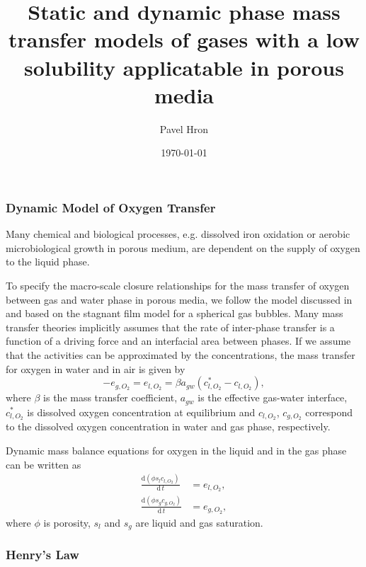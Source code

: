 \documentclass[a4paper,12pt]{article}
\title{Static and dynamic phase mass transfer models of gases with a
  low solubility applicatable in porous media}
\author{Pavel Hron}
\date{\today}
\newcommand{\Sl}{\mbox{$s_l\xspace$}}
\newcommand{\Sg}{\mbox{$s_g\xspace$}}
\newcommand{\dder}{\mbox{$\textrm{d}$}}
\newcommand{\agw}{\mbox{$a_{gw}\xspace$}}
\newcommand{\coxyw}{\mbox{$c_{l,O_2}\xspace$}}
\newcommand{\coxyg}{\mbox{$c_{g,O_2}\xspace$}}
\newcommand{\coxys}{\mbox{$c^*_{l,O_2}\xspace$}}
\begin{document}
\maketitle

\subsubsection*{Dynamic Model of Oxygen Transfer}
Many chemical and biological processes, e.g. dissolved iron oxidation
or aerobic microbiological growth in porous medium, are dependent on
the supply of oxygen to the liquid phase.

To specify the macro-scale closure relationships for the mass transfer
of oxygen between gas and water phase in porous media, we follow the
model discussed in \cite{Geistlinger2005} and \cite{Holocher2003}
based on the stagnant film model for a spherical gas bubbles. Many
mass transfer theories implicitly assumes that the rate of inter-phase
transfer is a function of a driving force and an interfacial area
between phases. If we assume that the activities can be approximated
by the concentrations, the mass transfer for oxygen in water and in
air is given by
\begin{equation} - e_{g,O_2} = e_{l,O_2}=\beta \agw \left(\coxys -
\coxyw \right),
\end{equation} where $\beta$ is the mass transfer coefficient, $\agw$
is the effective gas-water interface, $\coxys$ is dissolved oxygen
concentration at equilibrium and $\coxyw$, $\coxyg$ correspond to the
dissolved oxygen concentration in water and gas phase, respectively.

Dynamic mass balance equations for oxygen in the liquid and in the gas
phase can be written as
\begin{align} \frac{\dder \left(\phi \Sl \coxyw \right)}{\dder \, t}
&= e_{l,O_2}, \label{Eq:OxygenTransfera} \\ \frac{\dder \left(\phi \Sg
\coxyg \right)}{\dder \, t} &= e_{g,O_2}, \label{Eq:OxygenTransferb}
\end{align} where $\phi$ is porosity, $\Sl$ and $\Sg$ are liquid and
gas saturation.

\subsubsection*{Henry's Law}
\end{document}
